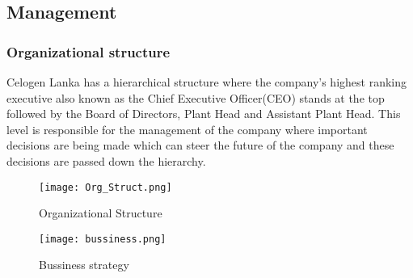 \documentclass[a4paper,12pt]{article}
\begin{document}
			\newpage
				
		\subsection{Management}
			\subsubsection{Organizational structure}
				Celogen Lanka has a hierarchical structure where the company's highest ranking executive also known as the Chief Executive Officer(CEO) stands at the top followed by the Board of Directors, Plant Head and Assistant Plant Head.
				This level is responsible for the management of the company where important decisions are being made which can steer the future of the company and these decisions are passed down the hierarchy.\\
								
					\begin{figure}[H]
						\begin{center}				
							\texttt{[image: Org\_Struct.png]}
						\end{center}
						\caption{Organizational Structure}
						\label{fig:Organizational Structure}
					\end{figure}
					
					\begin{figure}[H]
						\begin{center}				
							\texttt{[image: bussiness.png]}
						\end{center}
						\caption{Bussiness strategy}
						\label{fig:Bussiness strategy}
					\end{figure}	
				
				
\end{document}
